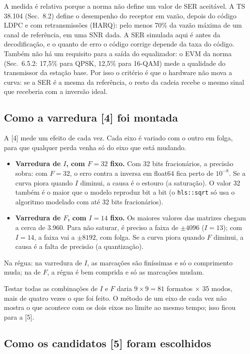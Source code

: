 \documentclass[11pt]{article}
\begin{document}
A medida é relativa porque a norma não define um valor de SER aceitável. A TS 38.104
(Sec.~8.2) define o desempenho do receptor em vazão, depois do código LDPC e com retransmissões
(HARQ): pelo menos 70\% da vazão máxima de um canal de referência, em uma SNR dada. A SER
simulada aqui é antes da decodificação, e o quanto de erro o código corrige depende da taxa do
código. Também não há um requisito para a saída do equalizador: o EVM da norma
(Sec.~6.5.2: 17,5\% para QPSK, 12,5\% para 16-QAM) mede a qualidade do transmissor da estação
base. Por isso o critério é que o hardware não mova a curva: se a SER é a mesma da referência,
o resto da cadeia recebe o mesmo sinal que receberia com a inversão ideal.

\subsection*{Como a varredura [4] foi montada}

A [4] mede um efeito de cada vez. Cada eixo é variado com o outro em folga, para que qualquer
perda venha só do eixo que está mudando.
\begin{itemize}
  \item \textbf{Varredura de $I$, com $F = 32$ fixo.} Com 32 bits fracionários, a precisão sobra:
        com $F = 32$, o erro contra a inversa em float64 fica perto de $10^{-8}$. Se a curva piora
        quando $I$ diminui, a causa é o estouro (a saturação). O valor 32 também é o maior que o
        modelo reproduz bit a bit (o \texttt{hls::sqrt} só usa o algoritmo modelado com até 32 bits
        fracionários).
  \item \textbf{Varredura de $F$, com $I = 14$ fixo.} Os maiores valores das matrizes chegam a
        cerca de 3.960. Para não saturar, é preciso a faixa de $\pm 4096$ ($I = 13$); com $I = 14$,
        a faixa vai a $\pm 8192$, com folga. Se a curva piora quando $F$ diminui, a causa é a falta
        de precisão (a quantização).
\end{itemize}
Na régua: na varredura de $I$, as marcações são finíssimas e só o comprimento muda; na de $F$, a
régua é bem comprida e só as marcações mudam.

Testar todas as combinações de $I$ e $F$ daria $9 \times 9 = 81$ formatos $\times$ 35 modos, mais
de quatro vezes o que foi feito. O método de um eixo de cada vez não mostra o que acontece com
os dois eixos no limite ao mesmo tempo; isso ficou para a [5].

\subsection*{Como os candidatos [5] foram escolhidos}
\end{document}
